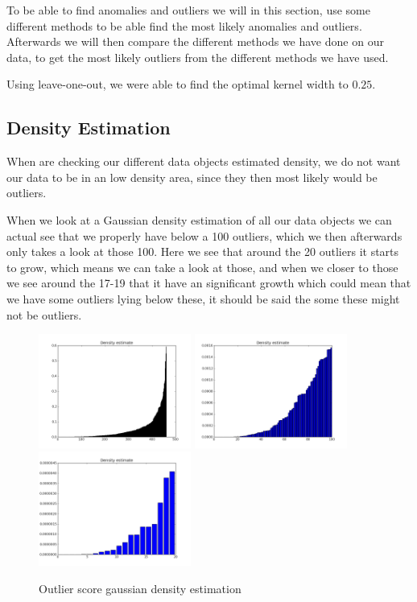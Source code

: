 To be able to find anomalies and outliers we will in this section, use some different methods to be able find the most likely anomalies and outliers. Afterwards we will then compare the different methods we have done on our data, to get the most likely outliers from the different methods we have used.

Using leave-one-out, we were able to find the optimal kernel width to $0.25$.

\subsection{Density Estimation}

When are checking our different data objects estimated density, we do not want our data to be in an low density area, since they then most likely would be outliers.

When we look at a Gaussian density estimation of all our data objects we can actual see that we properly have below a 100 outliers, which we then afterwards only takes a look at those 100. Here we see that around the 20 outliers it starts to grow, which means we can take a look at those, and when we closer to those we see around the 17-19 that it have an significant growth which could mean that we have some outliers lying below these, it should be said the some these might not be outliers.

\begin{figure}[H]
\centering
\includegraphics[width=5cm, keepaspectratio=true]{pictures/densityEstimationAll.png}
\includegraphics[width=5cm, keepaspectratio=true]{pictures/densityEstimation100.png}
\includegraphics[width=5cm, keepaspectratio=true]{pictures/densityEstimation20.png}
\vspace{-0.4cm}
\caption{\footnotesize Outlier score gaussian density estimation}
\label{gkd}
\end{figure}

